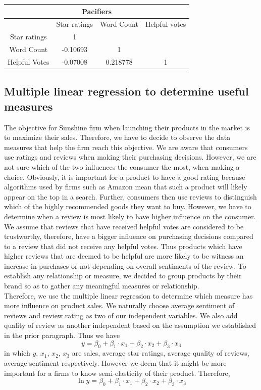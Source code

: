 \documentclass[reqno]{article}
\theoremstyle{definition}
\theoremstyle{definition}
\theoremstyle{remark}
\begin{document}
\begin{center}
\begin{tabular}{|c|c|c|c|}
\hline
\multicolumn{4}{|c|}{Pacifiers}\\
\hline
& Star ratings & Word Count & Helpful votes\\
\hline
Star ratings & 1 & & \\
Word Count & -0.10693 & 1 & \\
Helpful Votes & -0.07008 & 0.218778 & 1\\
\hline
\end{tabular}
\end{center}

\subsection{Multiple linear regression to determine useful measures}
The objective for Sunshine firm when launching their products in the market is to maximize their sales. Therefore, we have to decide to observe the data measures that help the firm reach this objective. We are aware that consumers use ratings and reviews when making their purchasing decisions. However, we are not sure which of the two influences the consumer the most, when making a choice. Obviously, it is important for a product to have a good rating because algorithms used by firms such as Amazon mean that such a product will likely appear on the top in a search. Further, consumers then use reviews to distinguish which of the highly recommended goods they want to buy. However, we have to determine when a review is most likely to have higher influence on the consumer. We assume that reviews that have received helpful votes are considered to be trustworthy, therefore, have a bigger influence on purchasing decisions compared to a review that did not receive any helpful votes. Thus products which have higher reviews that are deemed to be helpful are more likely to be witness an increase in purchases or not depending on overall sentiments of the review. To establish any relationship or measure, we decided to group products by their brand so as to gather any meaningful measures or relationship.\\ 
Therefore, we use the multiple linear regression to determine which measure has more influence on product sales. We naturally choose average sentiment of reviews and review rating as two of our independent variables. We also add quality of review as another independent based on the assumption we established in the prior paragraph. Thus we have
\[y=\beta_0+\beta_1 \cdot x_1+\beta_2 \cdot x_2+\beta_3 \cdot x_3\]
in which $y$, $x_1$, $x_2$, $x_3$ are sales, average star ratings, average quality of reviews, average sentiment respectively.
However we deem that it might be more important for a firms to know semi-elasticity of their product. Therefore,
\[\ln y=\beta_0+\beta_1 \cdot x_1+\beta_2 \cdot x_2+\beta_3 \cdot x_3\]
\end{document}
